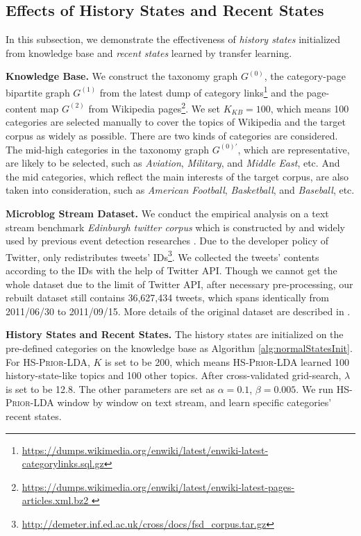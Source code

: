 \documentclass{article}
\begin{document}
\subsection{Effects of History States and Recent States}
In this subsection, we demonstrate the effectiveness of \textit{history states} initialized from knowledge base and \textit{recent states} learned by transfer learning. 

\textbf{Knowledge Base.} 
We construct the taxonomy graph \(G^{(0)}\), the category-page bipartite graph \(G^{(1)}\) from the latest dump of category links\footnote{\url{https://dumps.wikimedia.org/enwiki/latest/enwiki-latest-categorylinks.sql.gz}} and the page-content map \(G^{(2)}\) from Wikipedia pages\footnote{\url{https://dumps.wikimedia.org/enwiki/latest/enwiki-latest-pages-articles.xml.bz2 }}.
We set \(K_{KB}=100\), which means 100 categories are selected manually to cover the topics of Wikipedia and the target corpus as widely as possible. 
There are two kinds of categories are considered. 
The mid-high categories in the taxonomy graph \(G^{(0)'}\), which are representative, are likely to be selected, such as \textit{Aviation}, \textit{Military}, and \textit{Middle East}, etc.
And the mid categories, which reflect the main interests of the target corpus, are also taken into consideration, such as \textit{American Football}, \textit{Basketball}, and \textit{Baseball}, etc. 

\textbf{Microblog Stream Dataset.} We conduct the empirical analysis on a text stream benchmark \textit{Edinburgh twitter corpus} which is constructed by \cite{petrovic2012using} and widely used by previous event detection researches \cite{petrovic2013can} \cite{Wurzer:2015wq}. 
Due to the developer policy of Twitter, \cite{petrovic2012using} only redistributes tweets' IDs\footnote{\url{http://demeter.inf.ed.ac.uk/cross/docs/fsd_corpus.tar.gz}}.
We collected the tweets' contents according to the IDs with the help of Twitter API. 
Though we cannot get the whole dataset due to the limit of Twitter API, after necessary pre-processing, our rebuilt dataset still contains 36,627,434 tweets, which spans identically from 2011/06/30 to 2011/09/15.
More details of the original dataset are described in \cite{petrovic2010edinburgh}.

\textbf{History States and Recent States.} 
The history states are initialized on the pre-defined categories on the knowledge base as Algorithm \ref{alg:normalStatesInit}.
For \textsc{HS-Prior-LDA}, \(K\) is set to be 200, which means \textsc{HS-Prior-LDA} learned 100 history-state-like topics and 100 other topics.
After cross-validated grid-search, \(\lambda\) is set to be 12.8. The other parameters are set as \(\alpha=0.1\), \(\beta=0.005\).
We run \textsc{HS-Prior-LDA} window by window on text stream, and learn specific categories' recent states.
\end{document}
